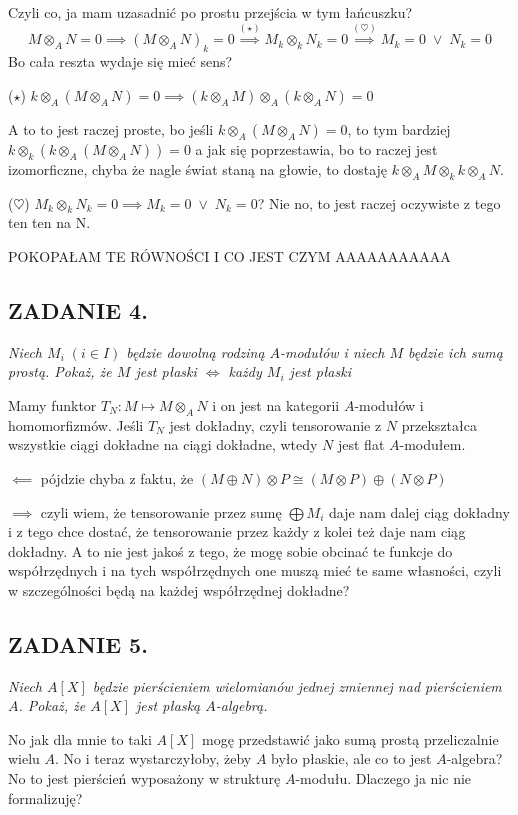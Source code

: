 \documentclass{article}
\begin{document}
Czyli co, ja mam uzasadnić po prostu przejścia w tym łańcuszku?
$$M\otimes_AN=0\implies(M\otimes_AN)_k=0\overset{(\star)}{\implies} M_k\otimes_kN_k=0\overset{(\heartsuit)}{\implies} M_k=0\;\lor\;N_k=0$$
Bo cała reszta wydaje się mieć sens?

($\star$) $k\otimes_A (M\otimes_AN)=0\implies(k\otimes_AM)\otimes_A(k\otimes_AN)=0$

A to to jest raczej proste, bo jeśli $k\otimes_A(M\otimes_AN)=0$, to tym bardziej $k\otimes_k(k\otimes_A(M\otimes_AN))=0$ a jak się poprzestawia, bo to raczej jest izomorficzne, chyba że nagle świat staną na głowie, to dostaję $k\otimes_AM\otimes_kk\otimes_AN$.

($\heartsuit$) $M_k\otimes_kN_k=0\implies M_k=0\;\lor\;N_k=0$? Nie no, to jest raczej oczywiste z tego ten ten na N.

{\color{orange}POKOPAŁAM TE RÓWNOŚCI I CO JEST CZYM AAAAAAAAAAA}

\subsection*{ZADANIE 4.}
\emph{\color{yellow}Niech $M_i\;(i\in I)$ będzie dowolną rodziną $A$-modułów i niech $M$ będzie ich sumą prostą. Pokaż, że $M$ jest płaski $\iff$ każdy $M_i$ jest płaski}
\smallskip

Mamy funktor $T_N:M\mapsto M\otimes_A N$ i on jest na kategorii $A$-modułów i homomorfizmów. Jeśli $T_N$ jest dokładny, czyli tensorowanie z $N$ przekształca wszystkie ciągi dokładne na ciągi dokładne, wtedy $N$ jest {\color{blue}flat} $A$-modułem.

$\impliedby$ pójdzie chyba z faktu, że $(M\oplus N)\otimes P\cong (M\otimes P)\oplus(N\otimes P)$

$\implies$ czyli wiem, że tensorowanie przez sumę $\bigoplus M_i$ daje nam dalej ciąg dokładny i z tego chce dostać, że tensorowanie przez każdy z kolei też daje nam ciąg dokładny. A to nie jest jakoś z tego, że mogę sobie obcinać te funkcje do współrzędnych i na tych współrzędnych one muszą mieć te same własności, czyli w szczególności będą na każdej współrzędnej dokładne?

\subsection*{ZADANIE 5.}
\emph{\color{yellow}Niech $A[X]$ będzie pierścieniem wielomianów jednej zmiennej nad pierścieniem $A$. Pokaż, że $A[X]$ jest płaską $A$-algebrą.}
\smallskip

No jak dla mnie to taki $A[X]$ mogę przedstawić jako sumą prostą przeliczalnie wielu $A$. No i teraz wystarczyłoby, żeby $A$ było płaskie, ale co to jest $A$-algebra?No to jest pierścień wyposażony w strukturę $A$-modułu. Dlaczego ja nic nie formalizuję?
\end{document}
